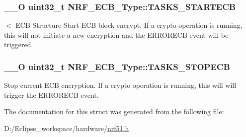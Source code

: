 \subsubsection[{T\+A\+S\+K\+S\+\_\+\+S\+T\+A\+R\+T\+E\+C\+B}]{\setlength{\rightskip}{0pt plus 5cm}\+\_\+\+\_\+\+O uint32\+\_\+t N\+R\+F\+\_\+\+E\+C\+B\+\_\+\+Type\+::\+T\+A\+S\+K\+S\+\_\+\+S\+T\+A\+R\+T\+E\+C\+B}\label{struct_n_r_f___e_c_b___type_ab9b2d57d5288323ecfa4a85ed8c88d2b}
$<$ E\+C\+B Structure Start E\+C\+B block encrypt. If a crypto operation is running, this will not initiate a new encryption and the E\+R\+R\+O\+R\+E\+C\+B event will be triggered. \hypertarget{struct_n_r_f___e_c_b___type_aaccfa905d37e48c1edb5812d79386fb5}{}
\subsubsection[{T\+A\+S\+K\+S\+\_\+\+S\+T\+O\+P\+E\+C\+B}]{\setlength{\rightskip}{0pt plus 5cm}\+\_\+\+\_\+\+O uint32\+\_\+t N\+R\+F\+\_\+\+E\+C\+B\+\_\+\+Type\+::\+T\+A\+S\+K\+S\+\_\+\+S\+T\+O\+P\+E\+C\+B}\label{struct_n_r_f___e_c_b___type_aaccfa905d37e48c1edb5812d79386fb5}
Stop current E\+C\+B encryption. If a crypto operation is running, this will will trigger the E\+R\+R\+O\+R\+E\+C\+B event. 

The documentation for this struct was generated from the following file\+:\begin{DoxyCompactItemize}
\item 
D\+:/\+Eclipse\+\_\+workspace/hardware/\hyperlink{nrf51_8h}{nrf51.\+h}\end{DoxyCompactItemize}
